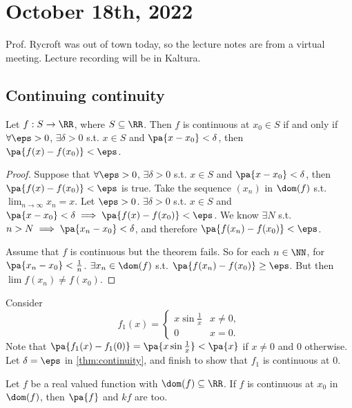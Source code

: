 \documentclass[11pt]{scrartcl}
\numberwithin{equation}{section}
\begin{document}
\section{October 18th, 2022}
Prof. Rycroft was out of town today, 
so the lecture notes are from a virtual meeting.
Lecture recording will be in Kaltura.
\subsection{Continuing continuity}
\begin{theorem}
    \label{thm:continuity}
    Let $f : S \rightarrow \RR$, where $S\subseteq \RR$. Then $f$ 
    is continuous at $x_0\in S$ if and only if $\forall\eps>0$,
    $\exists\delta>0$ s.t. $x\in S$ and $\pa{x-x_0}<\delta$, then 
    $\pa{f(x)-f(x_0)}<\eps$.
\end{theorem}

\begin{proof}
    Suppose that $\forall\eps>0$,
    $\exists\delta>0$ s.t. $x\in S$ and $\pa{x-x_0}<\delta$, then 
    $\pa{f(x)-f(x_0)}<\eps$ is true.
    Take the sequence $(x_n)$ in $\dom(f)$ s.t. $\lim_{n\rightarrow \infty}x_n = x$.
    Let $\eps>0$. $\exists \delta>0$ s.t. $x\in S$ and $\pa{x-x_0} < \delta
    \implies \pa{f(x)-f(x_0)}<\eps$. We know $\exists N$ s.t. 
    $n>N\implies \pa{x_n-x_0} < \delta$, and therefore 
    $\pa{f(x_n)-f(x_0)} < \eps$.

    Assume that $f$ is continuous but the theorem fails.
    So for each $n\in \NN$, for $\pa{x_n-x_0} < \frac{1}{n}$.
    $\exists x_n\in\dom(f)$ s.t. $\pa{f(x_n)-f(x_0)}\geq \eps$.
    But then $\lim f(x_n)\neq f(x_0)$.
\end{proof}

\begin{example}
    Consider \[ f_1(x) = \begin{cases}
        x\sin\frac{1}{x} &x\neq 0, \\
        0 &x=0.
    \end{cases}\]
    Note that $\pa{f_1(x) -f_1(0)} = \pa{x\sin\frac{1}{x}}<\pa{x}$
    if $x\neq 0$ and $0$ otherwise.
    Let $\delta = \eps$ in \cref{thm:continuity}, and finish to show that
    $f_1$ is continuous at $0$.
\end{example}

\begin{proposition}
    Let $f$ be a real valued function with $\dom(f)\subseteq \RR$.
    If $f$ is continuous at $x_0$ in $\dom(f)$, then $\pa{f}$ and 
    $kf$ are too.
\end{proposition}
\end{document}

